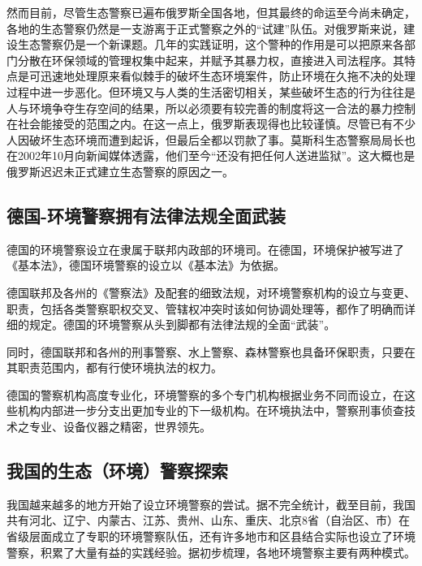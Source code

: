 \documentclass[
]{book}
\begin{document}
然而目前，尽管生态警察已遍布俄罗斯全国各地，但其最终的命运至今尚未确定，各地的生态警察仍然是一支游离于正式警察之外的``试建''队伍。对俄罗斯来说，建设生态警察仍是一个新课题。几年的实践证明，这个警种的作用是可以把原来各部门分散在环保领域的管理权集中起来，并赋予其暴力权，直接进入司法程序。其特点是可迅速地处理原来看似棘手的破坏生态环境案件，防止环境在久拖不决的处理过程中进一步恶化。但环境又与人类的生活密切相关，某些破坏生态的行为往往是人与环境争夺生存空间的结果，所以必须要有较完善的制度将这一合法的暴力控制在社会能接受的范围之内。在这一点上，俄罗斯表现得也比较谨慎。尽管已有不少人因破坏生态环境而遭到起诉，但最后全都以罚款了事。莫斯科生态警察局局长也在2002年10月向新闻媒体透露，他们至今``还没有把任何人送进监狱''。这大概也是俄罗斯迟迟未正式建立生态警察的原因之一。

\hypertarget{ux5fb7ux56fd-ux73afux5883ux8b66ux5bdfux62e5ux6709ux6cd5ux5f8bux6cd5ux89c4ux5168ux9762ux6b66ux88c5}{%
\subsection{德国-环境警察拥有法律法规全面武装}\label{ux5fb7ux56fd-ux73afux5883ux8b66ux5bdfux62e5ux6709ux6cd5ux5f8bux6cd5ux89c4ux5168ux9762ux6b66ux88c5}}

德国的环境警察设立在隶属于联邦内政部的环境司。在德国，环境保护被写进了《基本法》，德国环境警察的设立以《基本法》为依据。

德国联邦及各州的《警察法》及配套的细致法规，对环境警察机构的设立与变更、职责，包括各类警察职权交叉、管辖权冲突时该如何协调处理等，都作了明确而详细的规定。德国的环境警察从头到脚都有法律法规的全面``武装''。

同时，德国联邦和各州的刑事警察、水上警察、森林警察也具备环保职责，只要在其职责范围内，都有行使环境执法的权力。

德国的警察机构高度专业化，环境警察的多个专门机构根据业务不同而设立，在这些机构内部进一步分支出更加专业的下一级机构。在环境执法中，警察刑事侦查技术之专业、设备仪器之精密，世界领先。

\hypertarget{ux6211ux56fdux7684ux751fux6001ux73afux5883ux8b66ux5bdfux63a2ux7d22}{%
\subsection{我国的生态（环境）警察探索}\label{ux6211ux56fdux7684ux751fux6001ux73afux5883ux8b66ux5bdfux63a2ux7d22}}

我国越来越多的地方开始了设立环境警察的尝试。据不完全统计，截至目前，我国共有河北、辽宁、内蒙古、江苏、贵州、山东、重庆、北京8省（自治区、市）在省级层面成立了专职的环境警察队伍，还有许多地市和区县结合实际也设立了环境警察，积累了大量有益的实践经验。据初步梳理，各地环境警察主要有两种模式。
\end{document}
